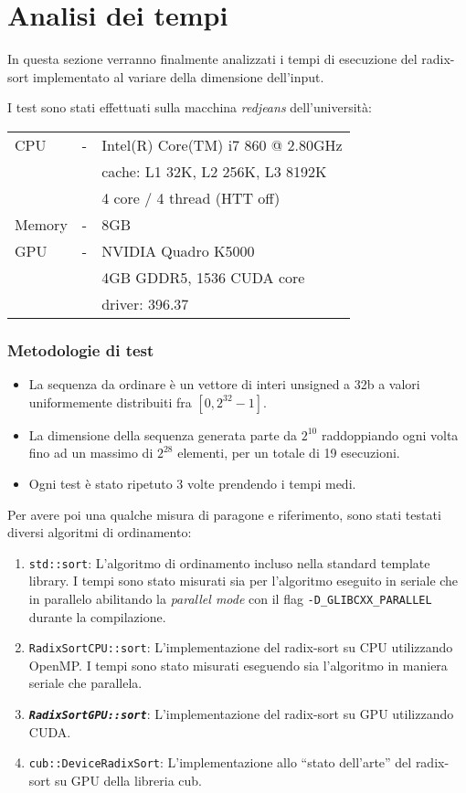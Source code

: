 \section{Analisi dei tempi}
In questa sezione verranno finalmente analizzati i tempi di esecuzione del radix-sort implementato al variare della dimensione dell'input.

I test sono stati effettuati sulla macchina \textit{redjeans} dell'università:
\begin{center}
	\centering \ttm
	\begin{tabular}{lcl}
		CPU & - & Intel(R) Core(TM) i7 860  @ 2.80GHz \\
		&& cache: L1 32K, L2 256K, L3 8192K \\
		&& 4 core / 4 thread (HTT off) \\
		Memory & - & 8GB \\
		GPU & - & NVIDIA Quadro K5000 \\
		&& 4GB GDDR5, 1536 CUDA core \\
		&& driver: 396.37 \\
	\end{tabular}
\end{center}

\subsubsection{Metodologie di test}
\begin{itemize}
\item La sequenza da ordinare è un vettore di interi unsigned a 32b a valori uniformemente distribuiti fra $[0, 2^{32}-1]$.
\item La dimensione della sequenza generata parte da $2^{10}$ raddoppiando ogni volta fino ad un massimo di $2^{28}$ elementi, per un totale di 19 esecuzioni.
\item Ogni test è stato ripetuto 3 volte prendendo i tempi medi.
\end{itemize}

Per avere poi una qualche misura di paragone e riferimento, sono stati testati diversi algoritmi di ordinamento:
\begin{enumerate}
\item \texttt{std::sort}: L'algoritmo di ordinamento incluso nella standard template library. I tempi sono stato misurati sia per l'algoritmo eseguito in seriale che in parallelo abilitando la \textit{parallel mode} con il flag \texttt{-D\_GLIBCXX\_PARALLEL} durante la compilazione.
\item \texttt{RadixSortCPU::sort}: L'implementazione del radix-sort su CPU utilizzando OpenMP.  I tempi sono stato misurati eseguendo sia l'algoritmo in maniera seriale che parallela.
\item \textit{\textbf{\texttt{RadixSortGPU::sort}}}: L'implementazione del radix-sort su GPU utilizzando CUDA.
\item \texttt{cub::DeviceRadixSort}: L'implementazione allo \enquote{stato dell'arte} del radix-sort su GPU della libreria cub.
\end{enumerate}

